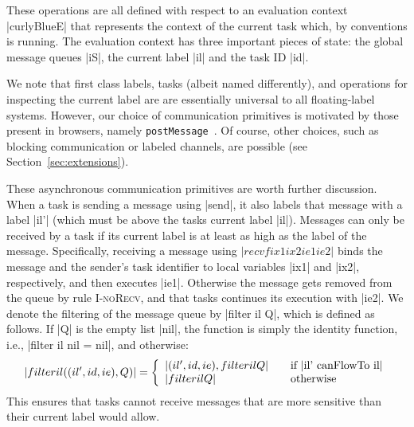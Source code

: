 These operations are all defined with respect to an evaluation context
|curlyBlueE| that represents the context of the current task which, by
conventions is running. The evaluation context has three important pieces of
state: the global message queues |iS|, the current label |il| and the task ID |id|.

We note that first class labels, tasks (albeit named differently), and
operations for inspecting the current label are are essentially universal to
all floating-label systems.
%
However, our choice of communication primitives is motivated by
those present in browsers, namely \texttt{postMessage}~\cite{webmessaging}.
%
Of course, other choices, such as blocking communication or labeled channels,
are possible (see Section~\ref{sec:extensions}).
%

These asynchronous communication primitives are worth further
discussion.  When a task is sending a message using |send|, it also labels that
message with a label |il'| (which must be above the tasks current label |il|).
Messages can only be received by a task if its current label is
at least as high as the label of the message.
Specifically, receiving a message using
$|recvf ix1 ix2 ie1 ie2|$
binds the message and the sender's task identifier
to local variables |ix1| and |ix2|, respectively, and then executes |ie1|.
Otherwise the message gets removed from the queue by rule \textsc{I-noRecv},
and that tasks continues its execution with |ie2|.
We denote the filtering of the message queue by |filter il Q|,
which is defined as follows.
If |Q| is the empty list |nil|, the
function is simply the identity function, i.e.,
|filter il nil = nil|, and otherwise:
\[
|filter il ((il', id, ie) , Q )| = \left\{
\begin{array}{l l}
|(il', id, ie) , filter il Q| & \quad \text{if |il' canFlowTo il|}\\
|filter il Q| & \quad \text{otherwise}
\end{array} \right.
\]
This ensures that tasks cannot receive messages that are more sensitive
than their current label would allow.

